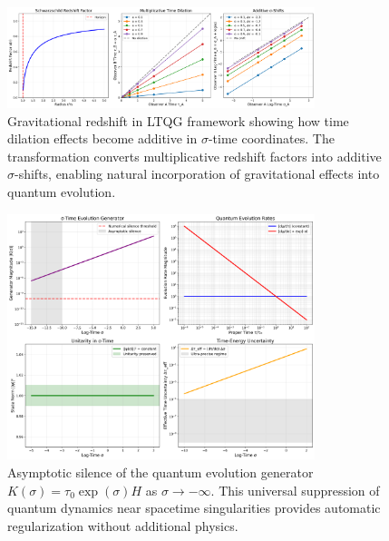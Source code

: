 \documentclass[12pt,a4paper]{article}
\begin{document}
\begin{figure}[H]
\centering
\includegraphics[width=0.8\textwidth]{figs/gravitational_redshift_shift.png}
\caption{Gravitational redshift in LTQG framework showing how time dilation effects become additive in $\sigma$-time coordinates. The transformation converts multiplicative redshift factors into additive $\sigma$-shifts, enabling natural incorporation of gravitational effects into quantum evolution.}
\label{fig:gravitational_redshift}
\end{figure}

\begin{figure}[H]
\centering
\includegraphics[width=0.8\textwidth]{figs/effective_generator_silence.png}
\caption{Asymptotic silence of the quantum evolution generator $K(\sigma) = \tau_0 \exp(\sigma) H$ as $\sigma \to -\infty$. This universal suppression of quantum dynamics near spacetime singularities provides automatic regularization without additional physics.}
\label{fig:generator_silence}
\end{figure}
\end{document}
